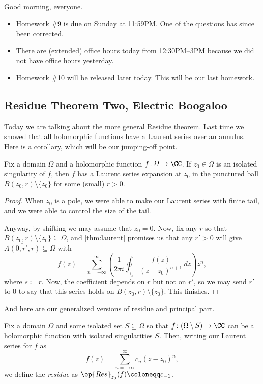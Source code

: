 \documentclass[../notes.tex]{subfiles}
\begin{document}

Good morning, everyone.
\begin{itemize}
	\item Homework \#9 is due on Sunday at 11:59PM. One of the questions has since been corrected.
	\item There are (extended) office hours today from 12:30PM--3PM because we did not have office hours yesterday.
	\item Homework \#10 will be released later today. This will be our last homework.
\end{itemize}

\subsection{Residue Theorem Two, Electric Boogaloo}
Today we are talking about the more general Residue theorem. Last time we showed that all holomorphic functions have a Laurent series over an annulus. Here is a corollary, which will be our jumping-off point.
\begin{corollary}
	Fix a domain $\Omega$ and a holomorphic function $f\colon\Omega\to\CC$. If $z_0\in\overline\Omega$ is an isolated singularity of $f$, then $f$ has a Laurent series expansion at $z_0$ in the punctured ball $B(z_0,r)\setminus\{z_0\}$ for some (small) $r>0$.
\end{corollary}
\begin{proof}
	When $z_0$ is a pole, we were able to make our Laurent series with finite tail, and we were able to control the size of the tail.

	Anyway, by shifting we may assume that $z_0=0$. Now, fix any $r$ so that $B(z_0,r)\setminus\{z_0\}\subseteq\Omega$, and \autoref{thm:laurent} promises us that any $r'>0$ will give $\overline{A(0,r',r)}\subseteq\Omega$ with
	\[f(z)=\sum_{n=-\infty}^\infty\left(\frac1{2\pi i}\oint_{\gamma_s}\frac{f(z)}{(z-z_0)^{n+1}}\,dz\right)z^n,\]
	where $s\coloneqq r$. Now, the coefficient depends on $r$ but not on $r'$, so we may send $r'$ to $0$ to say that this series holds on $B(z_0,r)\setminus\{z_0\}$. This finishes.
\end{proof}
And here are our generalized versions of residue and principal part.
\begin{definition}[Residue]
	Fix a domain $\Omega$ and some isolated set $S\subseteq\Omega$ so that $f\colon(\Omega\setminus S)\to\CC$ can be a holomorphic function with isolated singularities $S$. Then, writing our Laurent series for $f$ as
	\[f(z)=\sum_{n=-\infty}^\infty c_n(z-z_0)^n,\]
	we define the \textit{residue} as $\op{Res}_{z_0}(f)\coloneqq c_{-1}$.
\end{definition}
\end{document}
